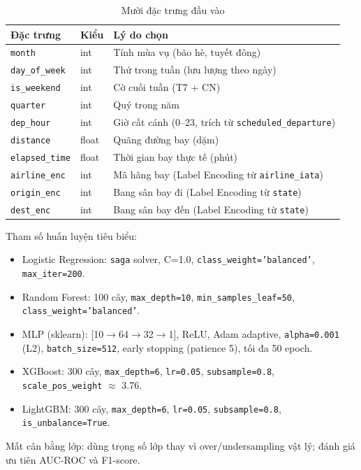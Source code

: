 \begin{table}[H]
\centering
\caption{Mười đặc trưng đầu vào}
\vspace{4pt}
\begin{tabular}{|l|l|l|}
\hline
\textbf{Đặc trưng} & \textbf{Kiểu} & \textbf{Lý do chọn} \\ \hline
\texttt{month}                & int   & Tính mùa vụ (bão hè, tuyết đông) \\ \hline
\texttt{day\_of\_week}        & int   & Thứ trong tuần (lưu lượng theo ngày) \\ \hline
\texttt{is\_weekend}          & int   & Cờ cuối tuần (T7 + CN) \\ \hline
\texttt{quarter}              & int   & Quý trong năm \\ \hline
\texttt{dep\_hour}            & int   & Giờ cất cánh (0--23, trích từ \texttt{scheduled\_departure}) \\ \hline
\texttt{distance}             & float & Quãng đường bay (dặm) \\ \hline
\texttt{elapsed\_time}        & float & Thời gian bay thực tế (phút) \\ \hline
\texttt{airline\_enc}         & int   & Mã hãng bay (Label Encoding từ \texttt{airline\_iata}) \\ \hline
\texttt{origin\_enc}          & int   & Bang sân bay đi (Label Encoding từ \texttt{state}) \\ \hline
\texttt{dest\_enc}            & int   & Bang sân bay đến (Label Encoding từ \texttt{state}) \\ \hline
\end{tabular}
\label{tab:features_impl}
\end{table}

\noindent Tham số huấn luyện tiêu biểu:
\begin{itemize}
  \item Logistic Regression: \texttt{saga} solver, C=1.0, \texttt{class\_weight='balanced'}, \texttt{max\_iter=200}.
  \item Random Forest: 100 cây, \texttt{max\_depth=10}, \texttt{min\_samples\_leaf=50}, \texttt{class\_weight='balanced'}.
  \item MLP (sklearn): [10$\to$64$\to$32$\to$1], ReLU, Adam adaptive, \texttt{alpha=0.001} (L2),
        \texttt{batch\_size=512}, early stopping (patience 5), tối đa 50 epoch.
  \item XGBoost: 300 cây, \texttt{max\_depth=6}, \texttt{lr=0.05}, \texttt{subsample=0.8},
        \texttt{scale\_pos\_weight} $\approx$ 3.76.
  \item LightGBM: 300 cây, \texttt{max\_depth=6}, \texttt{lr=0.05}, \texttt{subsample=0.8},
        \texttt{is\_unbalance=True}.
\end{itemize}

Mất cân bằng lớp: dùng trọng số lớp thay vì over/undersampling vật lý;
đánh giá ưu tiên AUC-ROC và F1-score.
